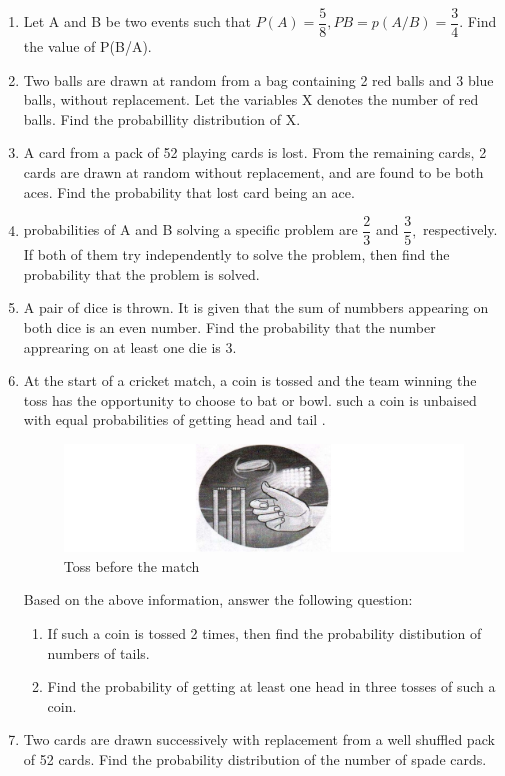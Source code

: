 \begin{enumerate}
\item Let A and B be two events such that $P(A) = \dfrac{5}{8}, P{B} = p(A/B) = \dfrac{3}{4}.$ Find the value of P(B/A).
\item Two balls are drawn at random from a bag containing 2 red balls and 3 blue balls, without replacement. Let the variables X denotes the number of red balls. Find the probabillity distribution of X.
\item A card from a pack of 52 playing cards is lost. From the remaining cards, 2 cards are drawn at random without replacement, and are found to be both aces. Find the probability that lost card being an ace.
\item probabilities of A and B solving a specific problem are $\dfrac{2}{3}$ and $\dfrac{3}{5},$ respectively. If both of them try independently to solve the problem, then find the probability that the problem is  solved.
\item A pair of dice is thrown. It is given that the sum of numbbers  appearing on both dice is an even number. Find the probability that the number apprearing on at least one die is 3.
\item At the start of a cricket match, a coin is tossed and the team winning the toss has the opportunity to choose to bat or bowl. such a coin is unbaised with equal probabilities of getting head and tail .
\begin{figure}[H]
\centering
\includegraphics[width=\columnwidth]{figs/coin}
\caption{Toss before the match}
\label{fig:coin1}
\end{figure}
Based on the above information, answer the following question:
\begin{enumerate}
\item If such a coin is tossed 2 times, then find the probability distibution of numbers of tails.
\item Find the probability of getting at least one head in three tosses of such a coin.
\end{enumerate}
\item Two cards are drawn successively with replacement from a well shuffled pack of 52 cards. Find the probability distribution of the number of spade cards.

\end{enumerate}
